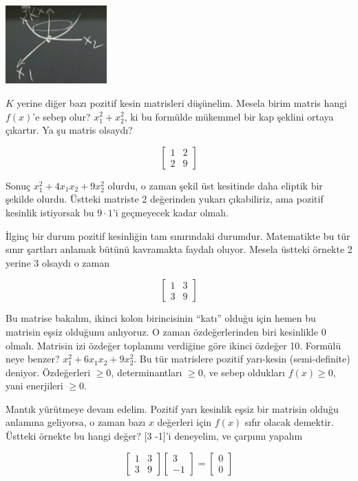 \documentclass[12pt,fleqn]{article}\usepackage{../../common}
\begin{document}
\includegraphics[height=3cm]{7_3.png}

$K$ yerine diğer bazı pozitif kesin matrisleri düşünelim. Mesela birim
matris hangi $f(x)$'e sebep olur? $x_1^2 + x_2^2$, ki bu formülde mükemmel
bir kap şeklini ortaya çıkartır. Ya şu matris olsaydı?

$$ 
\left[\begin{array}{rr}
1 & 2 \\
2 & 9
\end{array}\right]
 $$

Sonuç $x_1^2 + 4x_1x_2 + 9x_2^2$ olurdu, o zaman şekil üst kesitinde daha
eliptik bir şekilde olurdu. Üstteki matriste 2 değerinden yukarı
çıkabiliriz, ama pozitif kesinlik istiyorsak bu $9 \cdot 1$'i geçmeyecek
kadar olmalı.

İlginç bir durum pozitif kesinliğin tam sınırındaki durumdur. Matematikte
bu tür sınır şartları anlamak bütünü kavramakta faydalı oluyor. Mesela
üstteki örnekte 2 yerine 3 olsaydı o zaman

$$ 
\left[\begin{array}{rr}
1 & 3 \\
3 & 9
\end{array}\right]
 $$

Bu matrise bakalım, ikinci kolon birincisinin ``katı'' olduğu için hemen
bu matrisin eşsiz olduğunu anlıyoruz. O zaman özdeğerlerinden biri
kesinlikle 0 olmalı. Matrisin izi özdeğer toplamını verdiğine göre ikinci
özdeğer 10. Formülü neye benzer? $x_1^2 + 6x_1x_2 + 9x_2^2$. Bu tür
matrislere pozitif yarı-kesin (semi-definite) deniyor. Özdeğerleri $\ge 0$,
determinantları $\ge 0$, ve sebep oldukları $f(x) \ge 0$, yani enerjileri
$\ge 0$. 

Mantık yürütmeye devam edelim. Pozitif yarı kesinlik eşsiz bir matrisin
olduğu anlamına geliyorsa, o zaman bazı $x$ değerleri için $f(x)$ sıfır
olacak demektir. Üstteki örnekte bu hangi değer? [3 -1]'i deneyelim, ve
çarpımı yapalım

$$ 
\left[\begin{array}{rr}
1 & 3 \\
3 & 9
\end{array}\right]
\left[\begin{array}{r}
3 \\
-1
\end{array}\right] =
\left[\begin{array}{r}
0 \\
0
\end{array}\right] 
 $$
\end{document}
